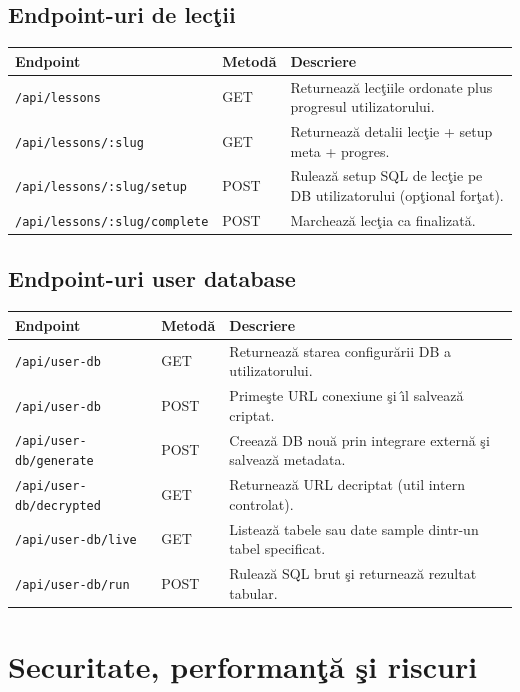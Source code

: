 \documentclass[12pt,onecolumn,draftclsnofoot]{IEEEtran}
\begin{document}
\subsection{Endpoint-uri de lec\c{t}ii}
\begin{longtable}{p{} p{} p{}}
\toprule
\textbf{Endpoint} & \textbf{Metod\u{a}} & \textbf{Descriere} \\
\midrule
\texttt{/api/lessons} & GET & Returneaz\u{a} lec\c{t}iile ordonate plus progresul utilizatorului. \\
\texttt{/api/lessons/:slug} & GET & Returneaz\u{a} detalii lec\c{t}ie + setup meta + progres. \\
\texttt{/api/lessons/:slug/setup} & POST & Ruleaz\u{a} setup SQL de lec\c{t}ie pe DB utilizatorului (op\c{t}ional for\c{t}at). \\
\texttt{/api/lessons/:slug/complete} & POST & Marcheaz\u{a} lec\c{t}ia ca finalizat\u{a}. \\
\bottomrule
\end{longtable}

\subsection{Endpoint-uri user database}
\begin{longtable}{p{} p{} p{}}
\toprule
\textbf{Endpoint} & \textbf{Metod\u{a}} & \textbf{Descriere} \\
\midrule
\texttt{/api/user-db} & GET & Returneaz\u{a} starea configur\u{a}rii DB a utilizatorului. \\
\texttt{/api/user-db} & POST & Prime\c{s}te URL conexiune \c{s}i \^{\i}l salveaz\u{a} criptat. \\
\texttt{/api/user-db/generate} & POST & Creeaz\u{a} DB nou\u{a} prin integrare extern\u{a} \c{s}i salveaz\u{a} metadata. \\
\texttt{/api/user-db/decrypted} & GET & Returneaz\u{a} URL decriptat (util intern controlat). \\
\texttt{/api/user-db/live} & GET & Listeaz\u{a} tabele sau date sample dintr-un tabel specificat. \\
\texttt{/api/user-db/run} & POST & Ruleaz\u{a} SQL brut \c{s}i returneaz\u{a} rezultat tabular. \\
\bottomrule
\end{longtable}

\section{Securitate, performan\c{t}\u{a} \c{s}i riscuri}
\end{document}
